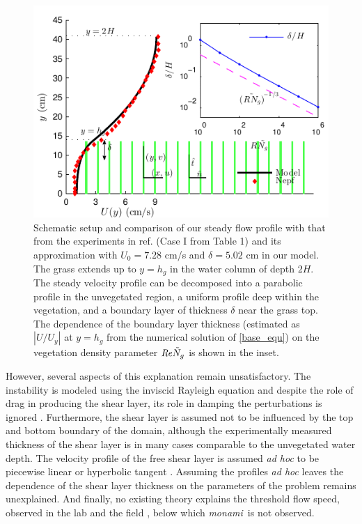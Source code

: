 \documentclass{jfm}
\newcommand{\hg}{h_g}
\newcommand{\Ndg}{\tilde{N}_g}
\newcommand{\monami}{\textit{monami}}
\newcommand{\ReyNdg}{{\Rey\Ndg}}
\begin{document}
\begin{figure}
\centerline{\includegraphics[scale=.99]{Grass_Base_Nepf_shear} }
\caption{
Schematic setup and comparison of our steady flow profile with that from the experiments in ref. \cite{Nepf04} (Case I from Table 1) %
 and its approximation with $U_0=7.28$ cm/s and $\delta = 5.02$ cm in our model. The grass extends up to $y=\hg$ in the water column of depth $2H$. 
The steady velocity profile can be decomposed into a parabolic profile in the unvegetated region, a uniform profile deep within the vegetation, and a boundary layer of thickness $\delta$ near the grass top. 
The dependence of the boundary layer thickness (estimated as $|U/U_y|$ at $y=\hg$ from the numerical solution of \eqref{base_equ}) on the vegetation density parameter $\ReyNdg$ is shown in the inset.
}
\label{basicflow}
\end{figure}
However, several aspects of this explanation remain unsatisfactory. 
The instability is modeled using the inviscid Rayleigh equation and despite the role of drag in producing the shear layer, its role in damping the perturbations is ignored \citep{Raupach96}. 
Furthermore, the shear layer is assumed not to be influenced by the top and bottom boundary of the domain, although the experimentally measured thickness of the shear layer is in many cases comparable to the unvegetated water depth.
The velocity profile of the free shear layer is assumed \textit{ad hoc} to be piecewise linear \citep{Delangre06} or hyperbolic tangent \citep{Ghisal02,Raupach96}. 
Assuming the profiles \textit{ad hoc} leaves the dependence of the shear layer thickness on the parameters of the problem remains unexplained.
And finally, no existing theory explains the threshold flow speed, observed in the lab \citep{Ghisal02} and the field \citep{Grizzle96}, below which \monami ~is not observed.
\end{document}
